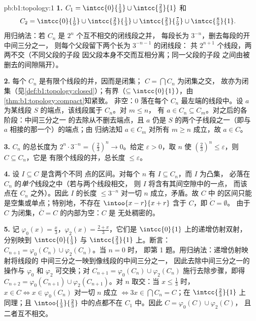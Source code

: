 \begin{solution}{pb:b1:topology:1}
\textbf{1.} $C_1 = \intcc{0}{\frac13} \cup \intcc{\frac23}{1}$
和
\[
C_2 = \intcc{0}{\tfrac19} \cup \intcc{\tfrac29}{\tfrac13}
\cup \intcc{\tfrac23}{\tfrac79} \cup \intcc{\tfrac89}{1} .
\]
用归纳法：若 $C_n$ 是 $2^n$ 个互不相交的闭线段之并，
每段长为 $3^{-n}$，删去每段的开中间三分之一，
则每个父段留下两个长为 $3^{-n-1}$ 的闭线段：
共 $2^{n+1}$ 个线段，两两不交（不同父段的子段
因父段本身不交而互相分离；同一父段的子段
之间由被删去的间隙隔开）。

\textbf{2.} 每个 $C_n$ 是有限个线段的并，因而是闭集；
$C = \bigcap C_n$ 为闭集之交，
故亦为闭集（见\cref{def:b1:topology:closed}）；有界（$\subseteq
\intcc{0}{1}$），由\cref{thm:b1:topology:compact}知紧致。
非空：$0$ 落在每个 $C_n$ 最左端的线段中。设
$a$ 为某线段 $S$ 的端点，该线段属于 $C_n$。对 $m \leq n$，
有 $a \in C_n \subseteq C_m$。对之后的各阶段：中间三分之一
的去除从不删去端点，且 $a$ 仍是
$S$ 的两个子线段之一（即与 $a$ 相接的那一个）的端点；由
归纳法知 $a \in C_m$ 对所有 $m \geq n$ 成立，故 $a \in C$。

\textbf{3.} $C_n$ 的总长度为 $2^n \cdot 3^{-n} =
(\frac23)^n \to 0$。给定 $\varepsilon > 0$，取 $n$ 使
$(\frac23)^n \leq \varepsilon$，则 $C \subseteq C_n$，它是
有限个线段的并，总长度 $\leq \varepsilon$。

\textbf{4.} 设 $I \subseteq C$ 是含两个不同
点的区间。对每个 $n$ 有 $I \subseteq C_n$，而 $I$ 为凸集，
必落在 $C_n$ 的\emph{单个}线段之中（若与两个线段相交，
则 $I$ 将含有其间空隙中的一点，
而该点在 $C_n$ 之外）。因此 $I$ 的长度 $\leq
3^{-n}$ 对一切 $n$ 成立，矛盾。故 $C$ 中
的区间只能是空集或单点；特别地，不存在
$\intoo{x-r}{x+r}$ 含于 $C$，即 $\mathring C = \emptyset$。
由于 $C$ 为闭集，$\overline C = C$ 的内部为空：$C$ 是
无处稠密的。

\textbf{5.} 记 $\varphi_0(x) = \frac x3$，$\varphi_2(x) =
\frac{2 + x}{3}$，它们是 $\intcc{0}{1}$ 上的递增仿射双射，
分别映到 $\intcc{0}{\frac13}$ 与 $\intcc{\frac23}{1}$ 上。断言：
$C_{n+1} = \varphi_0(C_n) \cup \varphi_2(C_n)$。当 $n = 0$ 时，
即第 1 题。用归纳法：递增仿射映射将线段的
中间三分之一映到像线段的中间三分之一，
因此去除中间三分之一的操作与 $\varphi_0$ 和
$\varphi_2$ 可交换；对 $C_{n+1} =
\varphi_0(C_n) \cup \varphi_2(C_n)$ 施行去除步骤，即得 $C_{n+2} =
\varphi_0(C_{n+1}) \cup \varphi_2(C_{n+1})$。对
$n$ 取交：当 $x \leq \frac13$ 时，$x \in C \iff x \in \varphi_0(C_n)$
对一切 $n$ 成立 $\iff 3x \in \bigcap C_n = C$；在
$\intcc{\frac23}{1}$ 上同理；且 $\intoo{\frac13}{\frac23}$
中的点都不在 $C_1$ 中。因此 $C = \varphi_0(C) \cup \varphi_2(C)$，
且二者互不相交。


\end{solution}
